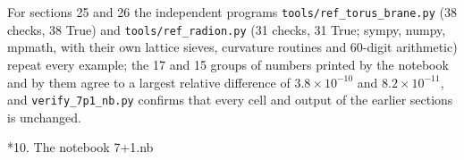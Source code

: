 \documentclass[10pt,a4paper]{article}
\makeatletter
\renewcommand\section{\@startsection{section}{1}{\z@}{-3.5ex \@plus -1ex \@minus -.2ex}{2.3ex \@plus.2ex}{\normalfont\Large\bfseries\raggedright}}
\makeatother
\begin{document}
For sections 25 and 26 the independent programs \texttt{tools/\allowbreak{}ref\_\allowbreak{}torus\_\allowbreak{}brane.py} (38 checks, 38 True) and \texttt{tools/\allowbreak{}ref\_\allowbreak{}radion.py} (31 checks, 31 True; sympy, numpy, mpmath, with their own lattice sieves, curvature routines and 60-digit arithmetic) repeat every example; the 17 and 15 groups of numbers printed by the notebook and by them agree to a largest relative difference of $3.8\times10^{-10}$ and $8.2\times10^{-11}$, and \texttt{verify\_\allowbreak{}7p1\_\allowbreak{}nb.py} confirms that every cell and output of the earlier sections is unchanged.

\section*{10. The notebook 7+1.nb}
\end{document}
